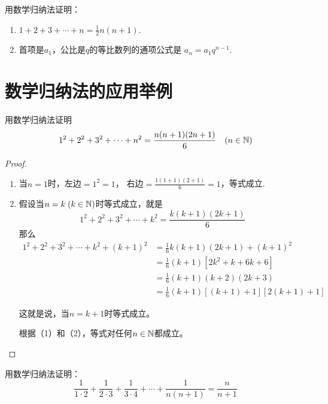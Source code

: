 \begin{ex}
    用数学归纳法证明：
\begin{enumerate}
 \item $1+2+3+\cdots +n=\frac{1}{2}n(n+1)$.
\item 首项是$a_1$，公比是$q$的等比数列的通项公式是
$a_n=a_1q^{n-1}$.
\end{enumerate}
\end{ex}

\section{数学归纳法的应用举例}
\begin{example}
   用数学归纳法证明
\[1^2+2^2+3^2+\cdots +n^2=\dfrac{n(n+1)(2n+1)}{6}\quad (n\in\mathbb{N})\]
\end{example}

\begin{proof}
\begin{enumerate}[(1)]
    \item 当$n=1$时，左边$=1^2=1$，
    右边$=\frac{1(1+1)(2+1)}{6}=1$，等式成立.
    \item 假设当$n=k\; (k\in\mathbb{N})$时等式成立，就是
  \[  1^2+2^2+3^2+\cdots+k^2=\frac{k(k+1)(2k+1)}{6}\]
那么
\[\begin{split}
    1^2+2^2+3^2+\cdots+k^2+(k+1)^2&=\frac{1}{6}k(k+1)(2k+1)+(k+1)^2\\
    &=\frac{1}{6}(k+1)[2k^2+k+6k+6]\\
    &=\frac{1}{6}(k+1)(k+2)(2k+3)\\
&=\frac{1}{6}(k+1)[(k+1)+1][2(k+1)+1]
\end{split}\]   

这就是说，当$n=k+1$时等式成立。

根据（1）和（2），等式对任何$n\in\mathbb{N}$都成立。
  \end{enumerate}  
\end{proof}

\begin{example}
    用数学归纳法证明：
    \[\frac{1}{1\cdot 2}+\frac{1}{2\cdot 3}+\frac{1}{3\cdot 4}+\cdots +\frac{1}{n(n+1)}=\frac{n}{n+1}\]
\end{example}

